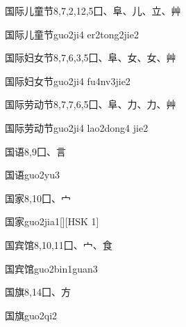 \begin{entry}{国际儿童节}{8,7,2,12,5}{⼞、⾩、⼉、⽴、⾋}
  \begin{phonetics}{国际儿童节}{guo2ji4 er2tong2jie2}
  \end{phonetics}
\end{entry}

\begin{entry}{国际妇女节}{8,7,6,3,5}{⼞、⾩、⼥、⼥、⾋}
  \begin{phonetics}{国际妇女节}{guo2ji4 fu4nv3jie2}
  \end{phonetics}
\end{entry}

\begin{entry}{国际劳动节}{8,7,7,6,5}{⼞、⾩、⼒、⼒、⾋}
  \begin{phonetics}{国际劳动节}{guo2ji4 lao2dong4 jie2}
  \end{phonetics}
\end{entry}

\begin{entry}{国语}{8,9}{⼞、⾔}
  \begin{phonetics}{国语}{guo2yu3}
  \end{phonetics}
\end{entry}

\begin{entry}{国家}{8,10}{⼞、⼧}
  \begin{phonetics}{国家}{guo2jia1}[][HSK 1]
  \end{phonetics}
\end{entry}

\begin{entry}{国宾馆}{8,10,11}{⼞、⼧、⾷}
  \begin{phonetics}{国宾馆}{guo2bin1guan3}
  \end{phonetics}
\end{entry}

\begin{entry}{国旗}{8,14}{⼞、⽅}
  \begin{phonetics}{国旗}{guo2qi2}
  \end{phonetics}
\end{entry}

